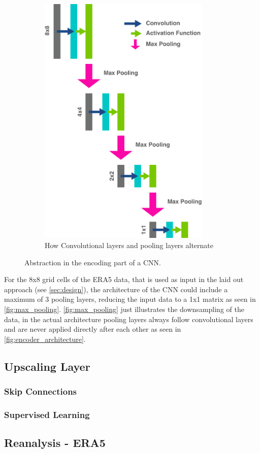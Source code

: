 \begin{figure}
\begin{subfigure}{0.25\textwidth}
        \includegraphics[width=0.9\textwidth]{resources/images/encoder_architecture.png}
        \caption{How Convolutional layers and pooling layers alternate}
        \label{fig:encoder_architecture}
    \end{subfigure}
    \caption{Abstraction in the encoding part of a CNN.}
\end{figure}


For the 8x8 grid cells of the ERA5 data, that is used as input in the laid out approach (see \autoref{sec:design}), the architecture of the CNN could include a maximum of 3 pooling layers, reducing the input data to a 1x1 matrix as seen in \autoref{fig:max_pooling}. \autoref{fig:max_pooling} just illustrates the downsampling of the data, in the actual architecture pooling layers always follow convolutional layers and are never applied directly after each other as seen in \autoref{fig:encoder_architecture}. 

\subsection*{Upscaling Layer}

\subsubsection*{Skip Connections}

\subsubsection*{Supervised Learning}

\subsection{Reanalysis - ERA5}


